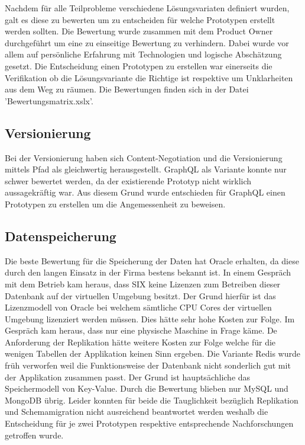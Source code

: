 Nachdem für alle Teilprobleme verschiedene Lösungsvariaten definiert wurden, galt es diese zu bewerten um zu entscheiden für welche Prototypen erstellt werden sollten. Die Bewertung wurde zusammen mit dem Product Owner durchgeführt um eine zu einseitige Bewertung zu verhindern. Dabei wurde vor allem auf persönliche Erfahrung mit Technologien und logische Abschätzung gesetzt. Die Entscheidung einen Prototypen zu erstellen war einerseits die Verifikation ob die Lösungsvariante die Richtige ist respektive um Unklarheiten aus dem Weg zu räumen. Die Bewertungen finden sich in der Datei 'Bewertungsmatrix.xslx'. 

\subsection{Versionierung}

Bei der Versionierung haben sich Content-Negotiation und die Versionierung mittels Pfad als gleichwertig herausgestellt. GraphQL als Variante konnte nur schwer bewertet werden, da der existierende Prototyp nicht wirklich aussagekräftig war. Aus diesem Grund wurde entschieden für GraphQL einen Prototypen zu erstellen um die Angemessenheit zu beweisen.

\subsection{Datenspeicherung}

Die beste Bewertung für die Speicherung der Daten hat Oracle erhalten, da diese durch den langen Einsatz in der Firma bestens bekannt ist. In einem Gespräch mit dem Betrieb kam heraus, dass SIX keine Lizenzen zum Betreiben dieser Datenbank auf der virtuellen Umgebung besitzt. Der Grund hierfür ist das Lizenzmodell von Oracle bei welchem sämtliche CPU Cores der virtuellen Umgebung lizenziert werden müssen. Dies hätte sehr hohe Kosten zur Folge. Im Gespräch kam heraus, dass nur eine physische Maschine in Frage käme. 
De Anforderung der Replikation hätte weitere Kosten zur Folge welche für die wenigen Tabellen der Applikation keinen Sinn ergeben.
Die Variante Redis wurde früh verworfen weil die Funktionsweise der Datenbank nicht sonderlich gut mit der Applikation zusammen passt. Der Grund ist hauptsächliche das Speichermodell von Key-Value.
Durch die Bewertung blieben nur MySQL und MongoDB übrig. Leider konnten für beide die Tauglichkeit bezüglich Replikation und Schemamigration nicht ausreichend beantwortet werden weshalb die Entscheidung für je zwei Prototypen respektive entsprechende Nachforschungen getroffen wurde.

